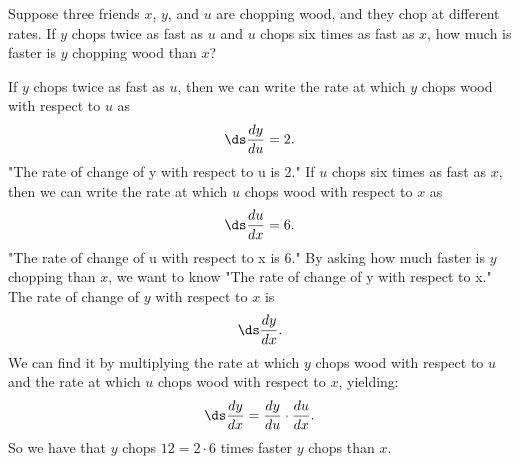 \begin{example} \label{Ex:2.6.Eg4}
Suppose three friends $x$, $y$, and $u$ are chopping wood, and they chop at different rates.  If $y$ chops twice as fast as $u$ and $u$ chops six times as fast as $x$, 	
how much is faster is $y$ chopping wood than $x$?

\solution
 If $y$ chops twice as fast as $u$, then we can write the rate at which $y$ chops wood with respect to $u$ as 
	\[ \ds \frac{dy}{du} = 2. \] 
"The rate of change of y with respect to u is 2."
If $u$ chops six times as fast as $x$, then we can write the rate at which $u$ chops wood with respect to $x$ as \[ \ds \frac{du}{dx} = 6. \] 
"The rate of change of u with respect to x is 6."
By asking how much faster is $y$ chopping than $x$,  we want to know 
"The rate of change of y with respect to x."
The rate of change of $y$ with respect to $x$ is
	\[ \ds \frac{dy}{dx}. \] 	
	We can find it by multiplying the rate at which $y$ chops wood with respect to $u$ and the rate at which $u$ chops wood with respect to $x$, yielding:
	\[ \ds \frac{dy}{dx} = \frac{dy}{du} \cdot \frac{du}{dx} . \] 
So we have that $y$ chops $12 = 2 \cdot 6$ times faster $y$ chops than $x$.	
	
\end{example}